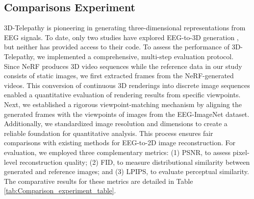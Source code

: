 \documentclass[conference]{IEEEtran}
\begin{document}
\subsection{Comparisons Experiment}
\begin{table}[htbp]
\caption{Ablation experiments on training strategies. The best results are shown in bold.}
\label{tab:my_table1}
\centering
\tiny
{}
\end{table}
3D-Telepathy is pioneering in generating three-dimensional representations from EEG signals. To date, only two studies have explored EEG-to-3D generation \cite{b44, b45}, but neither has provided access to their code. To assess the performance of 3D-Telepathy, we implemented a comprehensive, multi-step evaluation protocol. Since NeRF produces 3D video sequences while the reference data in our study consists of static images, we first extracted frames from the NeRF-generated videos. This conversion of continuous 3D renderings into discrete image sequences enabled a quantitative evaluation of rendering results from specific viewpoints. Next, we established a rigorous viewpoint-matching mechanism by aligning the generated frames with the viewpoints of images from the EEG-ImageNet dataset. Additionally, we standardized image resolution and dimensions to create a reliable foundation for quantitative analysis. This process ensures fair comparisons with existing methods for EEG-to-2D image reconstruction. For evaluation, we employed three complementary metrics: (1) PSNR, to assess pixel-level reconstruction quality; (2) FID, to measure distributional similarity between generated and reference images; and (3) LPIPS, to evaluate perceptual similarity. The comparative results for these metrics are detailed in Table \ref{tab:Comparison_experiment_table}.
\end{document}
